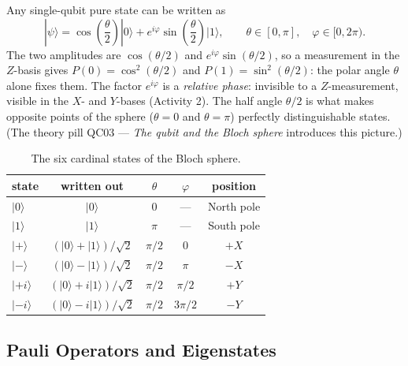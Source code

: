 \documentclass[a4paper,11pt]{article}
\providecommand{\ket}[1]{|{#1}\rangle}
\begin{document}
Any single-qubit pure state can be written as
\begin{equation}
    \ket{\psi} = \cos\!\left(\frac{\theta}{2}\right)\ket{0}
    + e^{i\varphi}\sin\!\left(\frac{\theta}{2}\right)\ket{1},
    \qquad \theta \in [0,\pi],\quad \varphi \in [0, 2\pi).
    \label{eq:bloch}
\end{equation}
The two amplitudes are $\cos(\theta/2)$ and $e^{i\varphi}\sin(\theta/2)$, so a
measurement in the $Z$-basis gives $P(0) = \cos^2(\theta/2)$ and
$P(1) = \sin^2(\theta/2)$: the polar angle $\theta$ alone fixes them. The factor
$e^{i\varphi}$ is a \emph{relative phase}: invisible to a $Z$-measurement, visible in the
$X$- and $Y$-bases (Activity 2). The half angle $\theta/2$ is what makes opposite points of
the sphere ($\theta = 0$ and $\theta = \pi$) perfectly distinguishable states. (The theory
pill QC03 --- \textit{The qubit and the Bloch sphere} introduces this picture.)

\begin{table}[H]
\centering
\begin{tabular}{lcccc}
\toprule
state & written out & $\theta$ & $\varphi$ & position \\
\midrule
$\ket{0}$ & $\ket{0}$ & $0$ & --- & North pole \\
$\ket{1}$ & $\ket{1}$ & $\pi$ & --- & South pole \\
$\ket{+}$ & $(\ket{0} + \ket{1})/\sqrt 2$ & $\pi/2$ & $0$ & $+X$ \\
$\ket{-}$ & $(\ket{0} - \ket{1})/\sqrt 2$ & $\pi/2$ & $\pi$ & $-X$ \\
$\ket{+i}$ & $(\ket{0} + i\ket{1})/\sqrt 2$ & $\pi/2$ & $\pi/2$ & $+Y$ \\
$\ket{-i}$ & $(\ket{0} - i\ket{1})/\sqrt 2$ & $\pi/2$ & $3\pi/2$ & $-Y$ \\
\bottomrule
\end{tabular}
\caption{The six cardinal states of the Bloch sphere.}
\label{tab:cardinal}
\end{table}

\subsection{Pauli Operators and Eigenstates}
\end{document}
